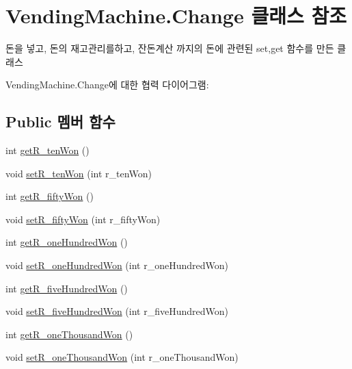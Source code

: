 \hypertarget{class_vending_machine_1_1_change}{}\section{Vending\+Machine.\+Change 클래스 참조}
\label{class_vending_machine_1_1_change}


돈을 넣고, 돈의 재고관리를하고, 잔돈계산 까지의 돈에 관련된 set,get 함수를 만든 클래스  




Vending\+Machine.\+Change에 대한 협력 다이어그램\+:
\subsection*{Public 멤버 함수}
\begin{DoxyCompactItemize}
\item 
int \hyperlink{class_vending_machine_1_1_change_a61c2682e5f0b7999cb830a45a94bfc78}{get\+R\+\_\+ten\+Won} ()
\item 
void \hyperlink{class_vending_machine_1_1_change_acb2664b80fd5564b3add62845ee0afc5}{set\+R\+\_\+ten\+Won} (int r\+\_\+ten\+Won)
\item 
int \hyperlink{class_vending_machine_1_1_change_a9d9200ae5ebb4b68d5f8435a16cbc905}{get\+R\+\_\+fifty\+Won} ()
\item 
void \hyperlink{class_vending_machine_1_1_change_aa930d31b2739651eb96b5b1d49dedf50}{set\+R\+\_\+fifty\+Won} (int r\+\_\+fifty\+Won)
\item 
int \hyperlink{class_vending_machine_1_1_change_a009fddaf04c554a4f3ecc9907b6a929e}{get\+R\+\_\+one\+Hundred\+Won} ()
\item 
void \hyperlink{class_vending_machine_1_1_change_a39efaf418a391d62174308b843ac6dd8}{set\+R\+\_\+one\+Hundred\+Won} (int r\+\_\+one\+Hundred\+Won)
\item 
int \hyperlink{class_vending_machine_1_1_change_a884e656f905999d7181b680299e9c9e9}{get\+R\+\_\+five\+Hundred\+Won} ()
\item 
void \hyperlink{class_vending_machine_1_1_change_a850d426d0b7150ef2095363590e1f0da}{set\+R\+\_\+five\+Hundred\+Won} (int r\+\_\+five\+Hundred\+Won)
\item 
int \hyperlink{class_vending_machine_1_1_change_a304e4aabef0c0ff7e21b3e761489f076}{get\+R\+\_\+one\+Thousand\+Won} ()
\item 
void \hyperlink{class_vending_machine_1_1_change_a37f3b2d778d33f32aff10e8985175b4b}{set\+R\+\_\+one\+Thousand\+Won} (int r\+\_\+one\+Thousand\+Won)

\end{DoxyCompactItemize}
